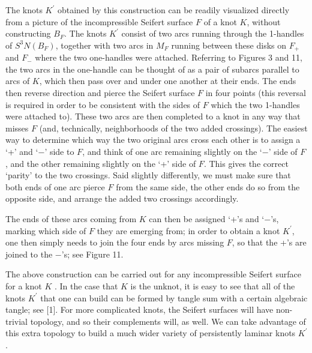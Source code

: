 The knots $K^\prime$ obtained by this construction
can be readily visualized directly from a 
picture of the incompressible Seifert surface $F$ of a knot $K$, 
without constructing $B_F$. The knots $K^\prime$ consist of two arcs 
running through the 1-handles of $S^3$\smin $N(B_F)$, together with 
two arcs in $M_F$ running between these disks on $F_+$ and $F_-$ 
where the two one-handles were attached. Referring to Figures 3 and 11, the 
two arcs in the one-handle can be thought of as a pair of subarcs 
parallel to arcs of $K$, which then pass over and under one another at 
their ends. The ends then reverse direction and pierce the Seifert 
surface $F$ in four points (this reversal is required in order to be 
consistent with the sides of $F$ which the two 1-handles were 
attached to). These two arcs are then completed to a knot in any way 
that misses $F$ (and, technically, neighborhoods of the two added 
crossings). The easiest way to determine which way the two original 
arcs cross each other is to assign a `+' and `$-$' side to $F$, and 
think of one arc remaining slightly on the `$-$' side of $F$, and the 
other remaining slightly on the `+' side of $F$. This gives the 
correct `parity' to the two crossings. Said slightly differently, we 
must make sure that both ends of one arc pierce $F$ from the same side, 
the other ends do so from the opposite side, and arrange the added 
two crossings accordingly. 

The ends of these arcs coming from $K$ 
can then be assigned `+'s and `$-$'s, marking which side of $F$ they 
are emerging from; in order to obtain a knot $K^\prime$, one then 
simply needs to join the four ends by arcs missing $F$, so that the 
+'s are joined to the $-$'s; see Figure 11.

\msk

\vglue 12pt
\vglue 5pt

The above construction can be carried out for any incompressible Seifert
surface for a knot $K$ . In the case that $K$ is the unknot, it is easy to see 
that all of the knots $K^\prime$ that one can build can be formed by tangle sum 
with a certain algebraic tangle; see [1]. For more complicated knots, the
Seifert surfaces will have non-trivial topology, and so their complements will, 
as well. We can take advantage of this extra topology to build a much wider 
variety of persistently laminar knots $K^\prime$.


\smallskip

